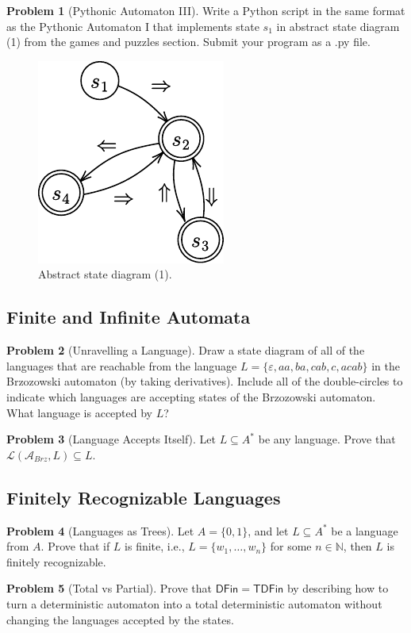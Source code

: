 \documentclass[11pt]{article}
\theoremstyle{theorem} %
\theoremstyle{definition} %
\newtheorem{problem}                    {{\color{BurntOrange}Problem}}
\theoremstyle{remark} %
\begin{document}
\begin{problem}
    [Pythonic Automaton III]
    Write a Python script in the same format as the Pythonic Automaton I that implements state \(s_1\) in abstract state diagram (1) from the games and puzzles section. 
    Submit your program as a .py file.

    \begin{figure}[h]
        \centering
        \includegraphics{../imgs/reverseengineering.pdf}
        \caption{Abstract state diagram (1).}
    \end{figure}
\end{problem}

\subsection*{Finite and Infinite Automata}

\begin{problem}
    [Unravelling a Language]
    Draw a state diagram of all of the languages that are reachable from the language \(L = \{\varepsilon, aa, ba, cab, c, acab\}\) in the Brzozowski automaton (by taking derivatives). 
    Include all of the double-circles to indicate which languages are accepting states of the Brzozowski automaton.
    What language is accepted by \(L\)?
\end{problem}

\begin{problem}
    [Language Accepts Itself]
    Let \(L \subseteq A^*\) be any language. 
    Prove that \(\mathcal L(\mathcal A_{Brz}, L) \subseteq L\).
\end{problem}

\subsection*{Finitely Recognizable Languages}

\begin{problem}
    [Languages as Trees]
    Let \(A = \{0, 1\}\), and let \(L \subseteq A^*\) be a language from \(A\). 
    Prove that if \(L\) is finite, i.e., \(L = \{w_1, \dots, w_n\}\) for some \(n \in \mathbb N\), then \(L\) is finitely recognizable.
\end{problem}

\begin{problem}
    [Total vs Partial]
    Prove that \(\mathsf{DFin} = \mathsf{TDFin}\) by describing how to turn a deterministic automaton into a total deterministic automaton without changing the languages accepted by the states.
\end{problem}
\end{document}
